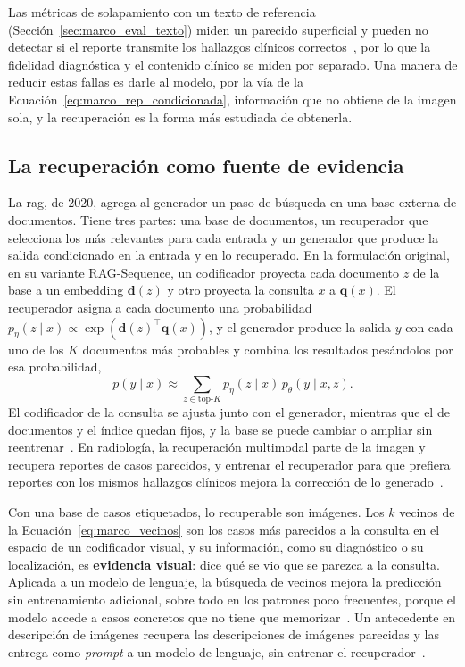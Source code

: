 Las métricas de solapamiento con un texto de referencia (Sección~\ref{sec:marco_eval_texto}) miden un
parecido superficial y pueden no detectar si el reporte transmite los hallazgos clínicos
correctos~\cite{hartsock2024vision}, por lo que la fidelidad
diagnóstica y el contenido clínico se miden por separado. Una manera de reducir estas fallas es darle al
modelo, por la vía de la Ecuación~\ref{eq:marco_rep_condicionada}, información que no obtiene de la imagen
sola, y la recuperación es la forma más estudiada de obtenerla.

\subsection{La recuperación como fuente de evidencia}
\label{sec:marco_rep_recuperacion}

\label{sec:marco_rag}%
La \gls{rag}, de 2020, agrega al generador un paso de búsqueda en una base externa de documentos. Tiene tres
partes: una base de documentos, un recuperador que selecciona los más relevantes para cada entrada y un
generador que produce la salida condicionado en la entrada y en lo recuperado. En la formulación original, en su variante
RAG-Sequence, un codificador proyecta cada documento $z$ de la base a un embedding $\mathbf{d}(z)$ y otro proyecta la consulta
$x$ a $\mathbf{q}(x)$. El recuperador asigna a cada documento una probabilidad
$p_\eta(z \mid x) \propto \exp\!\left(\mathbf{d}(z)^{\top}\mathbf{q}(x)\right)$, y el generador produce la
salida $y$ con cada uno de los $K$ documentos más probables y combina los resultados pesándolos por esa
probabilidad,
\begin{equation}
    p(y \mid x) \approx \sum_{z \in \text{top-}K} p_\eta(z \mid x)\, p_\theta(y \mid x, z).
    \label{eq:marco_rag}
\end{equation}
El codificador de la consulta se ajusta junto con el generador, mientras que el de documentos y el índice
quedan fijos, y la base se puede cambiar o ampliar sin reentrenar~\cite{lewis2020retrievalaugmented}. En
radiología, la recuperación multimodal parte de la imagen y recupera reportes de casos parecidos, y entrenar el
recuperador para que prefiera reportes con los mismos hallazgos clínicos mejora la corrección de lo
generado~\cite{sun2025factaware}.

\label{sec:marco_recuperacion_imagenes}%
Con una base de casos etiquetados, lo recuperable son imágenes. Los $k$ vecinos de la
Ecuación~\ref{eq:marco_vecinos} son los casos más parecidos a la consulta en el espacio de un codificador
visual, y su información, como su diagnóstico o su localización, es \textbf{evidencia visual}: dice qué se vio
que se parezca a la consulta. Aplicada a un modelo de lenguaje, la búsqueda de vecinos mejora la predicción sin
entrenamiento adicional, sobre todo en los patrones poco frecuentes, porque el modelo accede a casos concretos
que no tiene que memorizar~\cite{khandelwal2020generalization}. Un antecedente en descripción de imágenes
recupera las descripciones de imágenes parecidas y las entrega como \emph{prompt} a un modelo de lenguaje, sin
entrenar el recuperador~\cite{ramos2023smallcap}.

